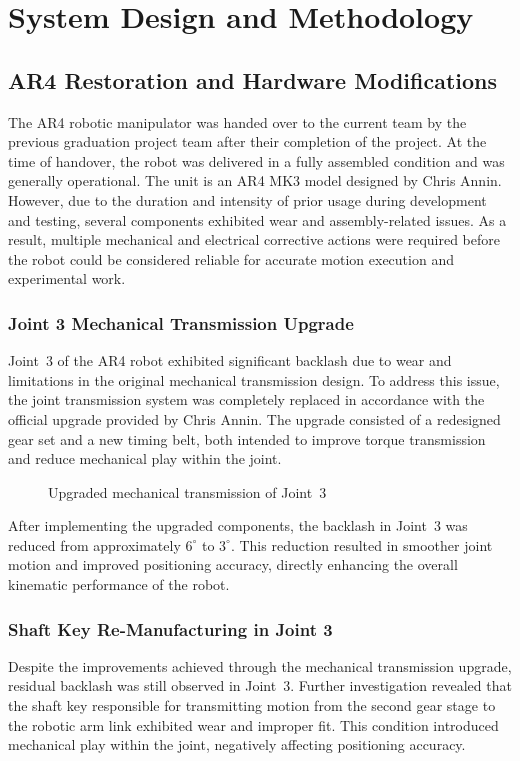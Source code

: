 \chapter{System Design and Methodology}
\section{AR4 Restoration and Hardware Modifications}
The AR4 robotic manipulator was handed over to the current
team by the previous graduation project team after their completion of the project.
At the time of handover, the robot was delivered in a fully assembled
condition and was generally operational. The unit is an AR4 MK3 model designed by
Chris Annin. However, due to the duration and intensity of prior
usage during development and testing, several components exhibited
wear and assembly-related issues. As a result, multiple mechanical
and electrical corrective actions were required before the 
robot could be considered reliable for accurate motion execution and 
experimental work.
\subsection{Joint 3 Mechanical Transmission Upgrade}
Joint~3 of the AR4 robot exhibited significant backlash due 
to wear and limitations in the original mechanical transmission 
design. To address this issue, the joint transmission system was 
completely replaced in accordance with the official upgrade 
provided by Chris Annin. The upgrade consisted of a redesigned 
gear set and a new timing belt, both intended to improve torque 
transmission and reduce mechanical play within the joint.

\begin{figure}[H]
    \centering
    \caption{Upgraded mechanical transmission of Joint~3 }
    \label{fig:joint3_upgrade}
\end{figure}

After implementing the upgraded components, the backlash in 
Joint~3 was reduced from approximately $6^\circ$ to $3^\circ$. 
This reduction resulted in smoother joint motion and improved 
positioning accuracy, directly enhancing the overall kinematic 
performance of the robot.

\subsection{Shaft Key Re-Manufacturing in Joint 3}
Despite the improvements achieved through the mechanical 
transmission upgrade, residual backlash was still observed in 
Joint~3. Further investigation revealed that the shaft key 
responsible for transmitting motion from the second gear stage 
to the robotic arm link exhibited wear and improper fit. 
This condition introduced mechanical play within the joint, 
negatively affecting positioning accuracy.

